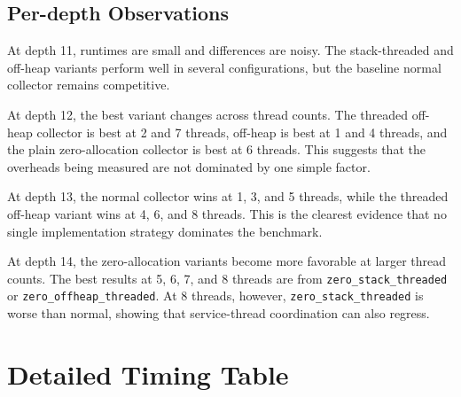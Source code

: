 \documentclass[11pt]{article}
\begin{document}
\subsection{Per-depth Observations}

At depth 11, runtimes are small and differences are noisy. The stack-threaded
and off-heap variants perform well in several configurations, but the baseline
normal collector remains competitive.

At depth 12, the best variant changes across thread counts. The threaded
off-heap collector is best at 2 and 7 threads, off-heap is best at 1 and 4
threads, and the plain zero-allocation collector is best at 6 threads. This
suggests that the overheads being measured are not dominated by one simple
factor.

At depth 13, the normal collector wins at 1, 3, and 5 threads, while the
threaded off-heap variant wins at 4, 6, and 8 threads. This is the clearest
evidence that no single implementation strategy dominates the benchmark.

At depth 14, the zero-allocation variants become more favorable at larger thread
counts. The best results at 5, 6, 7, and 8 threads are from
\texttt{zero\_stack\_threaded} or \texttt{zero\_offheap\_threaded}. At 8
threads, however, \texttt{zero\_stack\_threaded} is worse than normal, showing
that service-thread coordination can also regress.

\section{Detailed Timing Table}
\end{document}

